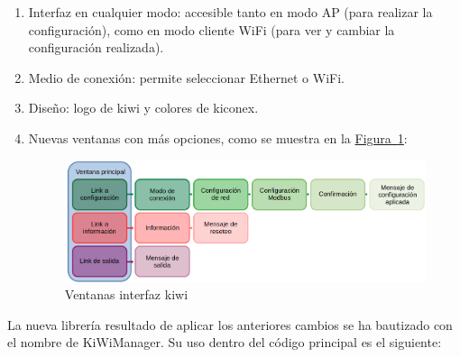 \begin{enumerate}
  \item Interfaz en cualquier modo: accesible tanto en modo AP (para realizar la configuración), como en modo cliente WiFi (para ver y cambiar la configuración realizada).
  \item Medio de conexión: permite seleccionar Ethernet o WiFi.
  \item Diseño: logo de kiwi y colores de kiconex.
  \item Nuevas ventanas con más opciones, como se muestra en la \hyperref[figura:ventanasKiwi]{Figura~\ref{figura:ventanasKiwi}}:

  \begin{figure}[H]
    \centering
    \includegraphics[width=\textwidth, keepaspectratio]{img/ventanasKiwi}
    \caption{Ventanas interfaz kiwi}
    \label{figura:ventanasKiwi}
  \end{figure}
\end{enumerate}

La nueva librería resultado de aplicar los anteriores cambios se ha bautizado con el nombre de KiWiManager. Su uso dentro del código principal es el siguiente:

